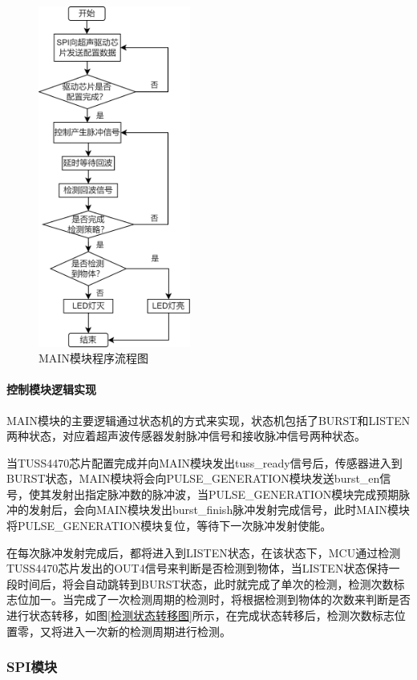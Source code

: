     \begin{figure}[ht]
        \centering
        \includegraphics[width=5cm]{figure/MAIN module flow chart.png}
        \caption{MAIN模块程序流程图}
        \label{MAIN模块程序流程图}
    \end{figure}
    
     \noindent
   \paragraph{控制模块逻辑实现}
    MAIN模块的主要逻辑通过状态机的方式来实现，状态机包括了BURST和LISTEN两种状态，对应着超声波传感器发射脉冲信号和接收脉冲信号两种状态。
    
    当TUSS4470芯片配置完成并向MAIN模块发出tuss\_ready信号后，传感器进入到BURST状态，MAIN模块将会向PULSE\_GENERATION模块发送burst\_en信号，使其发射出指定脉冲数的脉冲波，当PULSE\_GENERATION模块完成预期脉冲的发射后，会向MAIN模块发出burst\_finish脉冲发射完成信号，此时MAIN模块将PULSE\_GENERATION模块复位，等待下一次脉冲发射使能。
    
    在每次脉冲发射完成后，都将进入到LISTEN状态，在该状态下，MCU通过检测TUSS4470芯片发出的OUT4信号来判断是否检测到物体，当LISTEN状态保持一段时间后，将会自动跳转到BURST状态，此时就完成了单次的检测，检测次数标志位加一。当完成了一次检测周期的检测时，将根据检测到物体的次数来判断是否进行状态转移，如图\ref{检测状态转移图}所示，在完成状态转移后，检测次数标志位置零，又将进入一次新的检测周期进行检测。
       
    \subsubsection{SPI模块}

